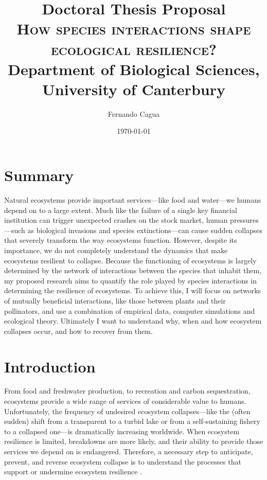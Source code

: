 \documentclass[a4paper]{report}
\title{
	{\large Doctoral Thesis Proposal} \\
	{\Huge \textsc{How species interactions shape ecological resilience?}} \\
	{\large Department of Biological Sciences, University of Canterbury}
}
\author{
  {\Large Fernando Cagua}
}
\date{\normalsize \today}
\begin{document}
\maketitle

\chapter*{Summary}

Natural ecosystems provide important services---like food and water---we humans depend on to a large extent.
Much like the failure of a single key financial institution can trigger unexpected crashes on the stock market, human pressures---such as biological invasions and species extinctions---can cause sudden collapses that severely transform the way ecosystems function.
However, despite its importance, we do not completely understand the dynamics that make ecosystems resilient to collapse.
Because the functioning of ecosystems is largely determined by the network of interactions between the species that inhabit them, my proposed research aims to quantify the role played by species interactions in determining the resilience of ecosystems.
To achieve this, I will focus on networks of mutually beneficial interactions, like those between plants and their pollinators, and use a combination of empirical data, computer simulations and ecological theory.
Ultimately I want to understand why, when and how ecosystem collapses occur, and how to recover from them.

\chapter*{Introduction}

From food and freshwater production, to recreation and carbon sequestration, ecosystems provide a wide range of services of considerable value to humans.
Unfortunately, the frequency of undesired ecosystem collapses---like the (often sudden) shift from a transparent to a turbid lake or from a self-sustaining fishery to a collapsed one---is dramatically increasing worldwide\citep{Scheffer2001a}.
When ecosystem resilience is limited, breakdowns are more likely, and their ability to provide those services we depend on is endangered.
Therefore, a necessary step to anticipate, prevent, and reverse ecosystem collapse is to understand the processes that support or undermine ecosystem resilience \citep{Hughes2005, Tylianakis2008}.
\end{document}
